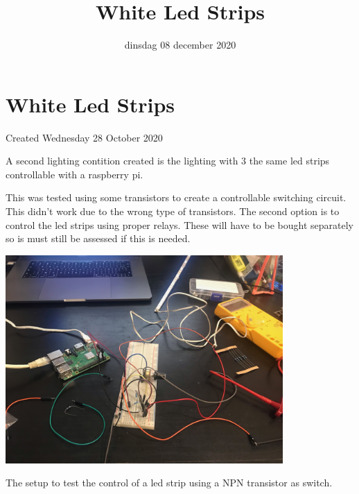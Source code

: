 \documentclass{scrartcl}
\title{White Led Strips}
\date{dinsdag 08 december 2020}
\author{}
\begin{document}
\maketitle

		\section{White Led Strips}

Created Wednesday 28 October 2020



A second lighting contition created is the lighting with 3 the same led strips controllable with a raspberry pi. 

This was tested using some transistors to create a controllable switching circuit. This didn't work due to the wrong type of transistors. The second option is to control the led strips using proper relays. These will have to be bought separately so is must still be assessed if this is needed.



\includegraphics[height=3.125000in, keepaspectratio=true]{./White_Led_Strips/Test_setup_ledstrip.jpeg}

The setup to test the control of a led strip using a NPN transistor as switch.
\end{document}
